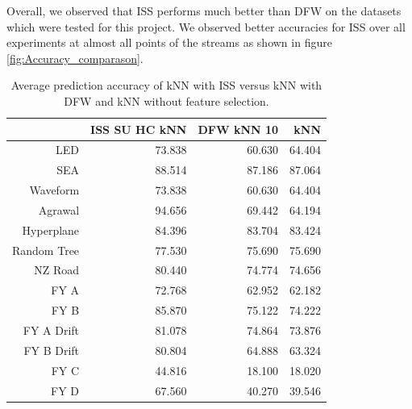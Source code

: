 Overall, we observed that ISS performs much better than DFW on the datasets which were tested for this project. We observed better accuracies for ISS over all experiments at almost all points of the streams as shown in figure  \ref{fig:Accuracy_comparason}.

\begin{table}[h]
\centering
\begin{tabular}{r|rrr}
            & ISS SU HC kNN & DFW kNN 10 & kNN    \\ \hline
LED         & 73.838           & 60.630     & 64.404 \\
SEA         & 88.514           & 87.186     & 87.064 \\
Waveform    & 73.838           & 60.630     & 64.404 \\
Agrawal     & 94.656           & 69.442     & 64.194 \\
Hyperplane  & 84.396           & 83.704     & 83.424 \\
Random Tree & 77.530           & 75.690     & 75.690 \\
NZ Road     & 80.440           & 74.774     & 74.656 \\
FY A        & 72.768           & 62.952     & 62.182 \\
FY B        & 85.870           & 75.122     & 74.222 \\
FY A Drift  & 81.078           & 74.864     & 73.876 \\
FY B Drift  & 80.804           & 64.888     & 63.324 \\
FY C        & 44.816           & 18.100     & 18.020 \\
FY D        & 67.560           & 40.270     & 39.546
\end{tabular}
\caption{Average prediction accuracy of kNN with ISS versus kNN with DFW and kNN without feature selection.}
\label{Table:Accuracy_comparason}
\end{table}


